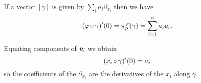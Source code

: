 \documentclass[a4paper,11pt]{article}
\begin{document}
	\begin{rmk}
		If a vector $[\gamma]$ is given by $\sum_i a_i \partial_{x_i}$ then we have
		\[
			(\varphi \operatorname{\circ} \gamma)'(0) = \pi_p^{\varphi}(\gamma) = \sum_{i = 1}^n a_i \vb e_i.
		\]
		
		Equating components of $\vb e_i$ we obtain
		\begin{equation}
			(x_i \operatorname{\circ} \gamma)'(0) = a_i
		\end{equation}
		so the coefficients of the $\partial_{x_i}$ are the derivatives of the $x_i$ along $\gamma$.
	\end{rmk}
\end{document}
